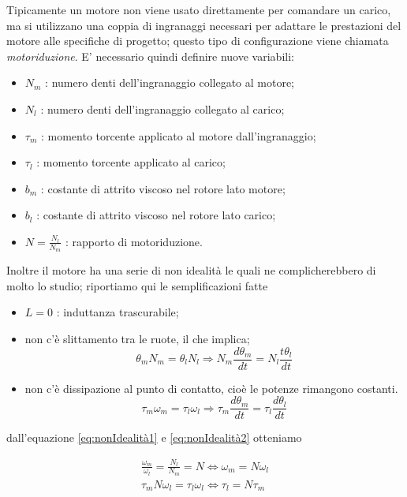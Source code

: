 		Tipicamente un motore non viene usato direttamente per comandare un carico, ma si utilizzano una coppia di ingranaggi necessari per adattare le prestazioni del motore alle specifiche di progetto; questo tipo di configurazione viene chiamata \textit{motoriduzione}. E' necessario quindi definire nuove variabili:
	
		\begin{itemize}
			\item $N_m$ : numero denti dell'ingranaggio collegato al motore;
			\item $N_l$ : numero denti dell'ingranaggio collegato al carico;
			\item $\tau_m$ : momento torcente applicato al motore dall'ingranaggio;
			\item $\tau_l$ : momento torcente applicato al carico;
			\item $b_m$ : costante di attrito viscoso nel rotore lato motore;
			\item $b_l$ : costante di attrito viscoso nel rotore lato carico;
			\item $N = \frac{N_l}{N_m}$ : rapporto di motoriduzione.
		\end{itemize}  
	
		\noindent Inoltre il motore ha una serie di non idealità le quali ne complicherebbero di molto lo studio; riportiamo qui le semplificazioni fatte
	
		\begin{itemize}
			\item $L = 0$ : induttanza trascurabile;
			\item non c'è slittamento tra le ruote, il che implica;
			\begin{equation}
				\theta_mN_m = \theta_lN_l \Longrightarrow N_m\frac{d\theta_m}{dt}=N_l\frac{t\theta_l}{dt}
				\label{eq:nonIdealità1}
			\end{equation}
			\item non c'è dissipazione al punto di contatto, cioè le potenze rimangono costanti.
			\begin{equation}
				\tau_m\omega_m=\tau_l\omega_l \Longrightarrow \tau_m\frac{d\theta_m}{dt}=\tau_l\frac{d\theta_l}{dt}
				\label{eq:nonIdealità2}  
			\end{equation}
		\end{itemize}
	
		\noindent dall'equazione \ref{eq:nonIdealità1} e \ref{eq:nonIdealità2} otteniamo
	
		\begin{gather}
			\frac{\omega_m}{\omega_l}=\frac{N_l}{N_m}=N \Longleftrightarrow \omega_m=N\omega_l \\
			\tau_mN\omega_l=\tau_l\omega_l \Longleftrightarrow \tau_l=N\tau_m
		\label{gat:comp}
		\end{gather}
	
